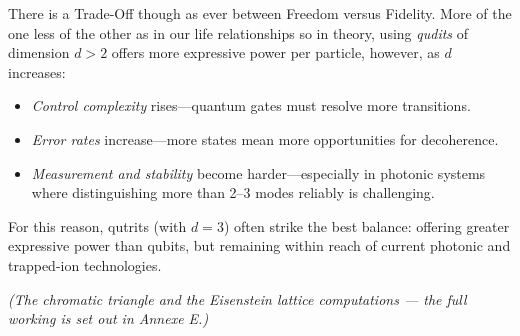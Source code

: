 There is a Trade-Off though as ever between Freedom versus Fidelity. More of the one less of the other as in our life relationships so in theory, using \textit{qudits} of dimension \( d > 2 \) offers more expressive power per particle, however, as \( d \) increases:
\begin{itemize}
  \item \textit{Control complexity} rises—quantum gates must resolve more transitions.
  \item \textit{Error rates} increase—more states mean more opportunities for decoherence.
  \item \textit{Measurement and stability} become harder—especially in photonic systems where distinguishing more than 2–3 modes reliably is challenging.
\end{itemize}

For this reason, qutrits (with \(d=3\)) often strike the best balance: offering greater expressive power than qubits, but remaining within reach of current photonic and trapped-ion technologies. 

\textit{(The chromatic triangle and the Eisenstein lattice computations --- the full working is set out in Annexe E.)}

